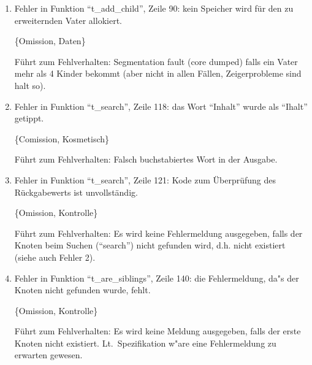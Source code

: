 \begin{enumerate}
\item Fehler in Funktion ``t\_add\_child'', Zeile 90:
kein Speicher wird f\"ur den zu erweiternden Vater allokiert.

\{Omission, Daten\}

F\"uhrt zum Fehlverhalten:  Segmentation fault (core dumped)
falls ein Vater mehr als 4 Kinder bekommt (aber nicht in allen
F\"allen, Zeigerprobleme sind halt so).


% 
% 
% 

\item Fehler in Funktion ``t\_search'', Zeile 118:
das Wort "`Inhalt"' wurde als ``Ihalt'' getippt.

\{Comission, Kosmetisch\}

F\"uhrt zum Fehlverhalten: Falsch buchstabiertes Wort in der Ausgabe. 


\item Fehler in Funktion ``t\_search'', Zeile 121:
Kode zum \"Uberpr\"ufung des R\"uckgabewerts ist unvollst\"andig.

\{Omission, Kontrolle\}

F\"uhrt zum Fehlverhalten: Es wird keine Fehlermeldung 
ausgegeben, falls der Knoten beim Suchen (``search'') nicht gefunden
wird, d.h. nicht existiert (siehe auch Fehler 2).

% 
% 


\item Fehler in Funktion ``t\_are\_siblings'', Zeile 140:
die Fehlermeldung, da"s der Knoten nicht gefunden wurde, fehlt.

\{Omission, Kontrolle\}

F\"uhrt zum Fehlverhalten: Es wird keine Meldung 
ausgegeben, falls der erste Knoten nicht existiert. Lt.~Spezifikation
w"are eine Fehlermeldung zu erwarten gewesen.


% 
% 



\end{enumerate}
